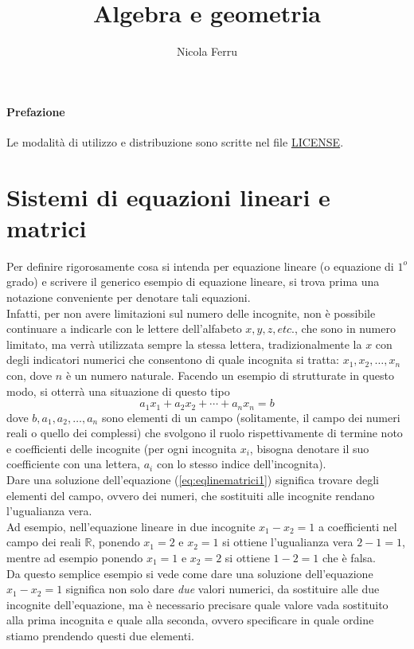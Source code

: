 \documentclass{book}
\title{Algebra e geometria}
\author{Nicola Ferru}
\theoremstyle{definition}
\theoremstyle{plain}
\begin{document}
\maketitle
\tableofcontents

\subsubsection{Prefazione}
\label{sec:pref}
Le modalità di utilizzo e distribuzione sono scritte nel file \href{https://github.com/NF02/Appunti-universita/blob/main/LICENSE}{LICENSE}.


\chapter{Sistemi di equazioni lineari e matrici}
\label{chap:eqlinematrici}

Per definire rigorosamente cosa si intenda per equazione lineare
(o equazione di $1^o$ grado) e scrivere il generico esempio di
equazione lineare, si trova prima una notazione conveniente per
denotare tali equazioni.\\
Infatti, per non avere limitazioni sul numero delle incognite,
non è possibile continuare a indicarle con le lettere
dell'alfabeto $x,y,z,etc.$, che sono in numero limitato, ma
verrà utilizzata sempre la stessa lettera, tradizionalmente
la $x$ con degli indicatori numerici che consentono di
quale incognita si tratta: $x_1,x_2,\dots,x_n$ con, dove $n$ è
un numero naturale. Facendo un esempio di strutturate in questo
modo, si otterrà una situazione di questo tipo
\begin{equation}
  \label{eq:eqlinematrici1}
  a_1x_1+a_2x_2+\cdots+a_nx_n=b
\end{equation}
dove $b,a_1,a_2,\dots,a_n$ sono elementi di un campo
(solitamente, il campo dei numeri reali o quello dei complessi)
che svolgono il ruolo rispettivamente di termine noto e
coefficienti delle incognite (per ogni incognita $x_i$, bisogna
denotare il suo coefficiente con una lettera, $a_i$ con lo stesso
indice dell'incognita).\\
Dare una soluzione dell'equazione (\ref{eq:eqlinematrici1})
significa trovare degli elementi del campo, ovvero dei numeri,
che sostituiti alle incognite rendano l'ugualianza vera.\\
Ad esempio, nell'equazione lineare in due incognite $x_1-x_2=1$
a coefficienti nel campo dei reali $\mathds{R}$, ponendo $x_1=2$
e $x_2=1$ si ottiene l'ugualianza vera $2-1=1$, mentre ad esempio
ponendo $x_1=1$ e $x_2=2$ si ottiene $1-2=1$ che è falsa.\\
Da questo semplice esempio si vede come dare una soluzione
dell'equazione $x_1-x_2=1$ significa non solo dare \textit{due}
valori numerici, da sostituire alle due incognite
dell'equazione, ma è necessario precisare quale valore vada
sostituito alla prima incognita e quale alla seconda, ovvero
specificare in quale ordine stiamo prendendo questi due
elementi.
\end{document}
